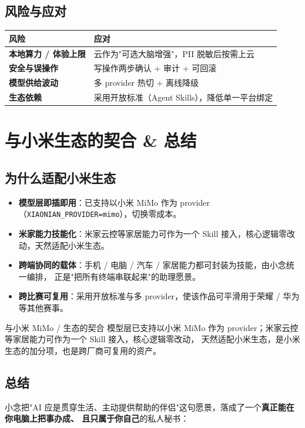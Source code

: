 \section{风险与应对}
\begin{center}
\small
\begin{tabularx}{\linewidth}{>{\bfseries}p{3.2cm} X}
\toprule
风险 & 应对 \\
\midrule
本地算力 / 体验上限 & 云作为"可选大脑增强"，PII 脱敏后按需上云 \\
安全与误操作 & 写操作两步确认 + 审计 + 可回滚 \\
模型供给波动 & 多 provider 热切 + 离线降级 \\
生态依赖 & 采用开放标准（Agent Skills），降低单一平台绑定 \\
\bottomrule
\end{tabularx}
\end{center}


\chapter{与小米生态的契合 \& 总结}

\section{为什么适配小米生态}
\begin{itemize}[leftmargin=1.4em]
  \item \textbf{模型层即插即用}：已支持以小米 MiMo 作为 provider（\texttt{XIAONIAN\_PROVIDER=mimo}），切换零成本。
  \item \textbf{米家能力技能化}：米家云控等家居能力可作为一个 Skill 接入，核心逻辑零改动，天然适配小米生态。
  \item \textbf{跨端协同的载体}：手机 / 电脑 / 汽车 / 家居能力都可封装为技能，由小念统一编排，
        正是"把所有终端串联起来"的助理愿景。
  \item \textbf{跨比赛可复用}：采用开放标准与多 provider，使该作品可平滑用于荣耀 / 华为等其他赛事。
\end{itemize}

\begin{keybox}{与小米 MiMo / 生态的契合}
模型层已支持以小米 MiMo 作为 provider；米家云控等家居能力可作为一个 Skill 接入，核心逻辑零改动，
天然适配小米生态，是小米生态的加分项，也是跨厂商可复用的资产。
\end{keybox}

\section{总结}
小念把"AI 应是贯穿生活、主动提供帮助的伴侣"这句愿景，落成了一个\textbf{真正能在你电脑上把事办成、
且只属于你自己}的私人秘书：

